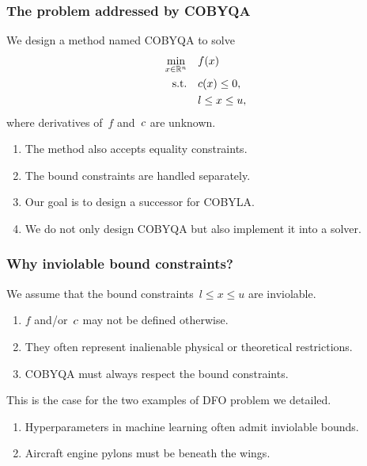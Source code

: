 \documentclass{polyu-presentation}
\newcommand{\con}[1][]{c\ifthenelse{\equal{#1}{}}{}{_{#1}}}
\newcommand{\obj}{f}
\newcommand{\xl}{l}
\newcommand{\xu}{u}
\begin{document}
\begin{frame}
    \frametitle{The problem addressed by COBYQA}
    
	We design a method named \alert{COBYQA} to solve
    \begin{align*}
        \min_{x \in \R^n}   & \quad \obj(x)\\
        \text{s.t.}         & \quad \con(x) \le 0,\\
                            & \quad \xl \le x \le \xu,
    \end{align*}
    where derivatives of~$\obj$ and~$\con$ are \alert{unknown}.

    \bigskip

    \begin{block}{}
        \begin{enumerate}
            \item The method also accepts \alert{equality constraints}.
            \item The bound constraints are handled separately.
            \item Our goal is to design a \alert{successor} for COBYLA.
            \item We do not only design COBYQA but also \alert{implement} it into a solver.
        \end{enumerate}
    \end{block}
\end{frame}

\begin{frame}
    \frametitle{Why inviolable bound constraints?}
    
	\begin{block}{}
        We assume that the bound constraints~$\xl \le x \le \xu$ are \alert{inviolable}.
        \begin{enumerate}
            \item $f$ and/or~$\con$ may \alert{not} be defined otherwise.
            \item They often represent inalienable physical or theoretical restrictions.
            \item COBYQA must \alert{always} respect the bound constraints.
        \end{enumerate}
    \end{block}

    \bigskip

    This is the case for the two examples of DFO problem we detailed.
    \begin{enumerate}
        \item Hyperparameters in machine learning often admit inviolable bounds.
        \item Aircraft engine pylons must be beneath the wings.
    \end{enumerate}
\end{frame}
\end{document}
